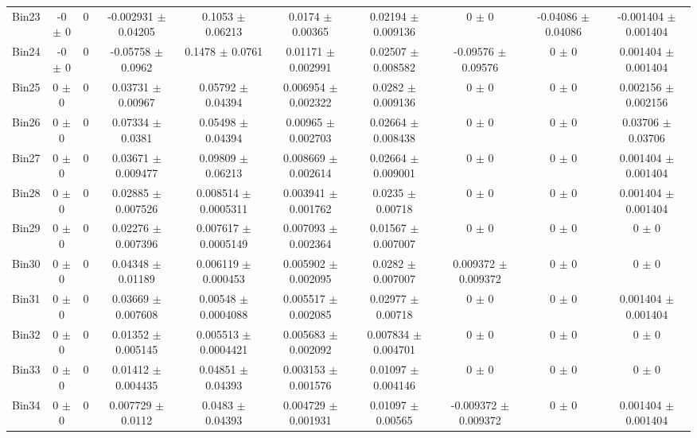 \begin{tabular}{@{\extracolsep{4pt}}lccccccccc@{}}
     Bin23 & -0 $\pm$ 0 & 0 & -0.002931 $\pm$ 0.04205 & 0.1053 $\pm$ 0.06213 & 0.0174 $\pm$ 0.00365 & 0.02194 $\pm$ 0.009136 & 0 $\pm$ 0 & -0.04086 $\pm$ 0.04086 & -0.001404 $\pm$ 0.001404 \\ 
     Bin24 & -0 $\pm$ 0 & 0 & -0.05758 $\pm$ 0.0962 & 0.1478 $\pm$ 0.0761 & 0.01171 $\pm$ 0.002991 & 0.02507 $\pm$ 0.008582 & -0.09576 $\pm$ 0.09576 & 0 $\pm$ 0 & 0.001404 $\pm$ 0.001404 \\ 
     Bin25 & 0 $\pm$ 0 & 0 & 0.03731 $\pm$ 0.00967 & 0.05792 $\pm$ 0.04394 & 0.006954 $\pm$ 0.002322 & 0.0282 $\pm$ 0.009136 & 0 $\pm$ 0 & 0 $\pm$ 0 & 0.002156 $\pm$ 0.002156 \\ 
     Bin26 & 0 $\pm$ 0 & 0 & 0.07334 $\pm$ 0.0381 & 0.05498 $\pm$ 0.04394 & 0.00965 $\pm$ 0.002703 & 0.02664 $\pm$ 0.008438 & 0 $\pm$ 0 & 0 $\pm$ 0 & 0.03706 $\pm$ 0.03706 \\ 
     Bin27 & 0 $\pm$ 0 & 0 & 0.03671 $\pm$ 0.009477 & 0.09809 $\pm$ 0.06213 & 0.008669 $\pm$ 0.002614 & 0.02664 $\pm$ 0.009001 & 0 $\pm$ 0 & 0 $\pm$ 0 & 0.001404 $\pm$ 0.001404 \\ 
     Bin28 & 0 $\pm$ 0 & 0 & 0.02885 $\pm$ 0.007526 & 0.008514 $\pm$ 0.0005311 & 0.003941 $\pm$ 0.001762 & 0.0235 $\pm$ 0.00718 & 0 $\pm$ 0 & 0 $\pm$ 0 & 0.001404 $\pm$ 0.001404 \\ 
     Bin29 & 0 $\pm$ 0 & 0 & 0.02276 $\pm$ 0.007396 & 0.007617 $\pm$ 0.0005149 & 0.007093 $\pm$ 0.002364 & 0.01567 $\pm$ 0.007007 & 0 $\pm$ 0 & 0 $\pm$ 0 & 0 $\pm$ 0 \\ 
     Bin30 & 0 $\pm$ 0 & 0 & 0.04348 $\pm$ 0.01189 & 0.006119 $\pm$ 0.000453 & 0.005902 $\pm$ 0.002095 & 0.0282 $\pm$ 0.007007 & 0.009372 $\pm$ 0.009372 & 0 $\pm$ 0 & 0 $\pm$ 0 \\ 
     Bin31 & 0 $\pm$ 0 & 0 & 0.03669 $\pm$ 0.007608 & 0.00548 $\pm$ 0.0004088 & 0.005517 $\pm$ 0.002085 & 0.02977 $\pm$ 0.00718 & 0 $\pm$ 0 & 0 $\pm$ 0 & 0.001404 $\pm$ 0.001404 \\ 
     Bin32 & 0 $\pm$ 0 & 0 & 0.01352 $\pm$ 0.005145 & 0.005513 $\pm$ 0.0004421 & 0.005683 $\pm$ 0.002092 & 0.007834 $\pm$ 0.004701 & 0 $\pm$ 0 & 0 $\pm$ 0 & 0 $\pm$ 0 \\ 
     Bin33 & 0 $\pm$ 0 & 0 & 0.01412 $\pm$ 0.004435 & 0.04851 $\pm$ 0.04393 & 0.003153 $\pm$ 0.001576 & 0.01097 $\pm$ 0.004146 & 0 $\pm$ 0 & 0 $\pm$ 0 & 0 $\pm$ 0 \\ 
     Bin34 & 0 $\pm$ 0 & 0 & 0.007729 $\pm$ 0.0112 & 0.0483 $\pm$ 0.04393 & 0.004729 $\pm$ 0.001931 & 0.01097 $\pm$ 0.00565 & -0.009372 $\pm$ 0.009372 & 0 $\pm$ 0 & 0.001404 $\pm$ 0.001404 \\ 

\end{tabular}
